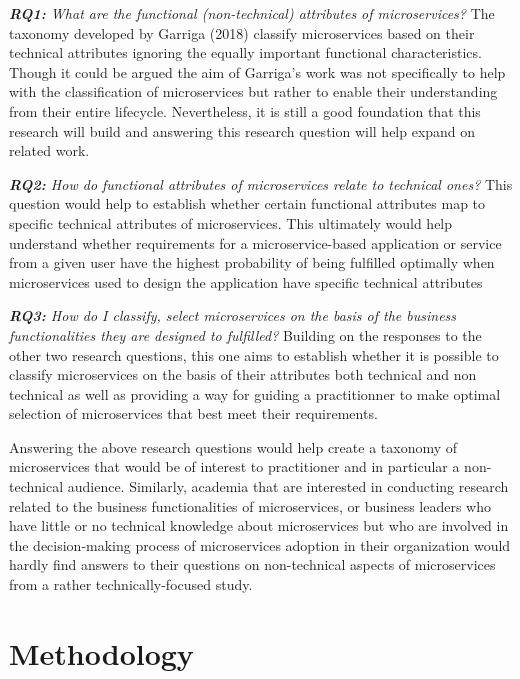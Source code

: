 \documentclass{article}
\begin{document}
\textit{\textbf{RQ1:} What are the functional (non-technical) attributes of microservices?} The taxonomy developed by Garriga (2018) classify microservices based on their technical attributes ignoring the equally important functional characteristics. Though it could be argued the aim of Garriga's work was not specifically to help with the classification of microservices but rather to enable their understanding from their entire lifecycle. Nevertheless, it is still a good foundation that this research will build and answering this research question will help expand on related work. 

\textit{\textbf{RQ2:} How do functional attributes of microservices relate to technical ones?} This question would help to establish whether certain functional attributes map to specific technical attributes of microservices. This ultimately would help understand whether requirements for a microservice-based application or service from a given user have the highest probability of being fulfilled optimally when microservices used to design the application have specific technical attributes

\textit{\textbf{RQ3:} How do I classify, select microservices on the basis of the business functionalities they are designed to fulfilled?} Building on the responses to the other two research questions, this one aims to establish whether it is possible to classify microservices on the basis of their attributes both technical and non technical as well as providing a way for guiding a practitionner to make optimal selection of microservices that best meet their requirements.

Answering the above research questions would help create a taxonomy of microservices that would be of interest to practitioner and in particular a non-technical audience. Similarly, academia that are interested in conducting research related to the business functionalities of microservices, or business leaders who have little or no technical knowledge about microservices but who are involved in the decision-making process of microservices adoption in their organization would hardly find answers to their questions on non-technical aspects of microservices from a rather technically-focused study.

\section{Methodology}
\end{document}

